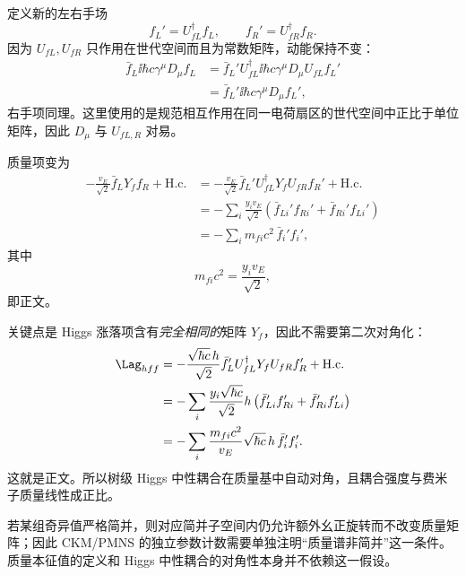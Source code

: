 \begin{derivation}
定义新的左右手场
\begin{equation*}
 f_L'=U_{fL}^\dagger f_L,
 \qquad
 f_R'=U_{fR}^\dagger f_R.
\end{equation*}
因为 $U_{fL},U_{fR}$ 只作用在世代空间而且为常数矩阵，动能保持不变：
\begin{align*}
 \bar f_L\ii\hbar c\gamma^\mu D_\mu f_L
 &=\bar f_L'U_{fL}^\dagger
 \ii\hbar c\gamma^\mu D_\mu U_{fL}f_L'\\
 &=\bar f_L'\ii\hbar c\gamma^\mu D_\mu f_L',
\end{align*}
右手项同理。这里使用的是规范相互作用在同一电荷扇区的世代空间中正比于单位矩阵，因此 $D_\mu$ 与 $U_{fL,R}$ 对易。

质量项变为
\begin{align*}
 -\frac{v_E}{\sqrt2}\bar f_LY_ff_R+\mathrm{H.c.}
 &=-\frac{v_E}{\sqrt2}
 \bar f_L'U_{fL}^\dagger Y_fU_{fR}f_R'
 +\mathrm{H.c.}\\
 &=-\sum_i\frac{y_iv_E}{\sqrt2}
 \left(\bar f_{Li}'f_{Ri}'+\bar f_{Ri}'f_{Li}'\right)\\
 &=-\sum_i m_{fi}c^2\,\bar f_i'f_i',
\end{align*}
其中
\begin{equation*}
 {m_{fi}c^2=\frac{y_iv_E}{\sqrt2}},
\end{equation*}
即正文。

关键点是 Higgs 涨落项含有\emph{完全相同的}矩阵 $Y_f$，因此不需要第二次对角化：
\begin{align*}
 \Lag_{hff}
 &=-\frac{\sqrt{\hbar c}\,h}{\sqrt2}
 \bar f_L'U_{fL}^\dagger Y_fU_{fR}f_R'
 +\mathrm{H.c.}\\
 &=-\sum_i
 \frac{y_i\sqrt{\hbar c}}{\sqrt2}
 h\left(\bar f_{Li}'f_{Ri}'+\bar f_{Ri}'f_{Li}'\right)\\
 &=-\sum_i
 \frac{m_{fi}c^2}{v_E}\sqrt{\hbar c}\,
 h\,\bar f_i'f_i'.
\end{align*}
这就是正文。所以树级 Higgs 中性耦合在质量基中自动对角，且耦合强度与费米子质量线性成正比。

若某组奇异值严格简并，则对应简并子空间内仍允许额外幺正旋转而不改变质量矩阵；因此 CKM/PMNS 的独立参数计数需要单独注明“质量谱非简并”这一条件。质量本征值的定义和 Higgs 中性耦合的对角性本身并不依赖这一假设。
\end{derivation}

